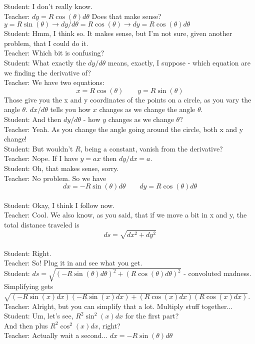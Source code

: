 Student: I don't really know.\\
Teacher: $dy = R \cos(\theta) d\theta$
Does that make sense?
$y = R \sin(\theta) \rightarrow dy/d\theta = R \cos(\theta) \rightarrow dy = R \cos(\theta) d\theta$\\
Student: Hmm, I think so.
It makes sense, but I'm not sure, given another problem, that I could do it.\\
Teacher: Which bit is confusing?\\
Student: What exactly the $dy/d\theta$ means, exactly, I suppose - which equation are we finding the derivative of?\\
Teacher: We have two equations: $$x = R \cos(\theta) \qquad y = R \sin(\theta)$$
Those give you the x and y coordinates of the points on a circle, as you vary the angle $\theta$.
$dx/d\theta$ tells you how $x$ changes as we change the angle $\theta$.\\
Student: And then $dy/d\theta$ - how $y$ changes as we change $\theta$?\\
Teacher: Yeah. As you change the angle going around the circle, both x and y change!\\
Student: But wouldn't $R$, being a constant, vanish from the derivative?\\
Teacher: Nope. If I have $y = a x$ then $dy/dx = a$.\\
Student: Oh, that makes sense, sorry.\\
Teacher: No problem. So we have $$dx = - R \sin(\theta) d\theta \qquad dy = R \cos(\theta) d\theta$$\\
Student: Okay, I think I follow now.\\
Teacher: Cool. We also know, as you said, that if we move a bit in x and y, the total distance traveled is $$ds = \sqrt{dx^2 + dy^2}$$\\
Student: Right. \\
Teacher: So! Plug it in and see what you get. \\
Student: $ds = \sqrt{(-R\sin(\theta)d\theta)^2+(R\cos(\theta)d\theta)^2}$ - convoluted madness.
Simplifying gets
$\sqrt{(-R\sin (x)dx)(-R\sin(x)dx)+(R\cos(x)dx)(R\cos(x)dx)}$.\\
Teacher: Alright, but you can simplify that a lot. Multiply stuff together...\\
Student: Um, let's see, $R^2 \sin^2(x)dx$ for the first part?\\
And then plus $R^2\cos^2(x)dx$, right?\\
Teacher: Actually wait a second... $dx = -R \sin(\theta) d\theta$
